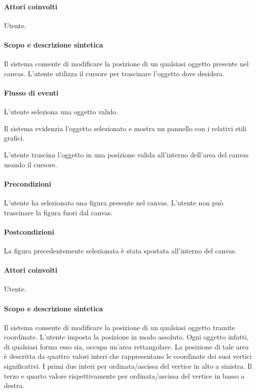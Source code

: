\paragraph{Attori coinvolti} Utente.
\paragraph{Scopo e descrizione sintetica} Il sistema consente di modificare la posizione di un qualsiasi oggetto presente nel canvas. L'utente utilizza il cursore per trascinare l'oggetto dove desidera.
\paragraph{Flusso di eventi}
\begin{elenconumerato}[\textbf{}]{\subsubsecindent}
\item L'utente seleziona una oggetto valido.
\item Il sistema evidenzia l'oggetto selezionato e mostra un pannello con i relativi stili grafici.
\item L'utente trascina l'oggetto in una posizione valida all'interno dell'area del canvas usando il cursore.
\end{elenconumerato}
\paragraph{Precondizioni} L'utente ha selezionato una figura presente nel canvas. L'utente non pu\` o trascinare la figura fuori dal canvas.
\paragraph{Postcondizioni} La figura precedentemente selezionata \`e stata spostata all'interno del canvas.
 

\paragraph{Attori coinvolti} Utente.
\paragraph{Scopo e descrizione sintetica}   Il sistema consente di modificare la posizione di un qualsiasi oggetto tramite coordinate.  L'utente  imposta la posizione in modo assoluto. Ogni oggetto infatti, di qualsiasi forma esso sia, occupa un'area rettangolare. La posizione di tale area \`e descritta da quattro valori interi che rappresentano le coordinate dei suoi vertici significativi. I primi due interi per ordinata/ascissa del vertice in alto a sinistra. Il terzo e quarto valore rispettivamente per ordinata/ascissa del vertice in basso a destra.

